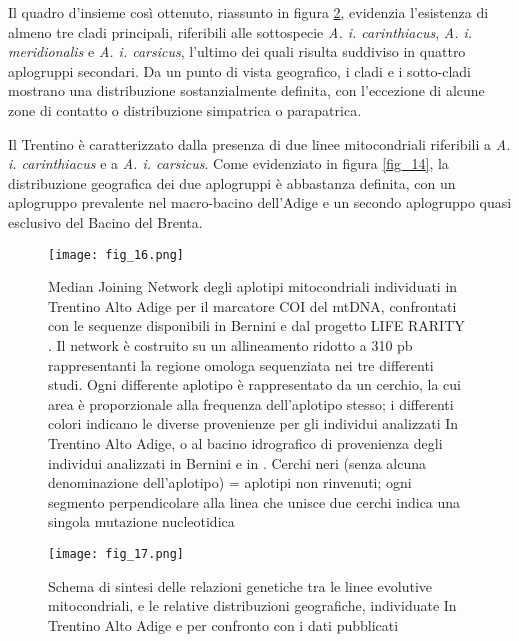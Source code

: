 \documentclass[11pt,a4paper,italian,twoside,openany]{memoir}
\begin{document}
Il quadro d'insieme così ottenuto, riassunto in figura \ref{fig_17}, evidenzia l'esistenza di almeno tre cladi principali, riferibili alle sottospecie \emph{A. i. carinthiacus}, \emph{A. i. meridionalis} e \emph{A. i. carsicus}, l'ultimo dei quali risulta suddiviso in quattro aplogruppi secondari. Da un punto di vista geografico, i cladi e i sotto-cladi mostrano una distribuzione sostanzialmente definita, con l'eccezione di alcune zone di contatto o distribuzione simpatrica o parapatrica.

Il Trentino è caratterizzato dalla presenza di due linee mitocondriali riferibili a \emph{A. i. carinthiacus} e a \emph{A. i. carsicus}. Come evidenziato in figura \ref{fig_14}, la distribuzione geografica dei due aplogruppi è abbastanza definita, con un aplogruppo prevalente nel macro-bacino dell'Adige e un secondo aplogruppo quasi esclusivo del Bacino del Brenta. 

\newpage

\begin{figure}[H]
  \centering
  \texttt{[image: fig\_16.png]}
  \caption{Median Joining Network degli aplotipi mitocondriali individuati in Trentino Alto Adige per il marcatore COI del mtDNA, confrontati con le sequenze disponibili in Bernini \protect\cite{Bernini 2016}  e dal progetto LIFE RARITY \protect\cite{Bertucci Maresca 2015}. Il network è costruito su un allineamento ridotto a 310 pb rappresentanti la regione omologa sequenziata nei tre differenti studi. Ogni differente aplotipo è rappresentato da un cerchio, la cui area è proporzionale alla frequenza dell'aplotipo stesso; i differenti colori indicano le diverse provenienze per gli individui analizzati In Trentino Alto Adige, o al bacino idrografico di provenienza degli individui analizzati in Bernini \protect\cite{Bernini 2016} e in \protect\cite{Bertucci Maresca 2015}. Cerchi neri (senza alcuna denominazione dell'aplotipo) = aplotipi non rinvenuti; ogni segmento perpendicolare alla linea che unisce due cerchi indica una singola mutazione nucleotidica}
  \label{fig_16}
\end{figure}

\begin{figure}[H]
  \centering
  \texttt{[image: fig\_17.png]}
  \caption{Schema di sintesi delle relazioni genetiche tra le linee evolutive mitocondriali, e le relative distribuzioni geografiche, individuate In Trentino Alto Adige e per confronto con i dati pubblicati \protect\cite{Bertucci Maresca 2015} \protect\cite{Bernini 2016}}
  \label{fig_17}
\end{figure}
\end{document}
